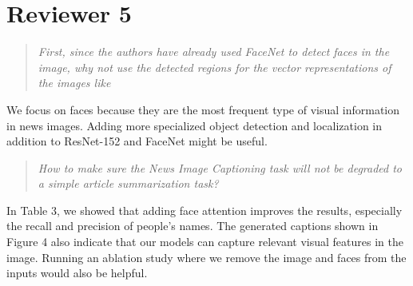 \documentclass[10pt,twocolumn,letterpaper]{article}
\begin{document}
\section{Reviewer 5}

\begin{quote}\textit{First, since the authors have already used FaceNet to
detect faces in the image, why not use the detected regions for the vector
representations of the images like~\cite{Anderson2017BottomUpAT}}
\end{quote}
We focus on faces because they are the most frequent type of visual information
in news images. Adding more specialized object detection and localization in
addition to ResNet-152 and FaceNet might be useful.

\begin{quote}\textit{How to make sure the News Image Captioning task will not
be degraded to a simple article summarization task?}
\end{quote}
In Table 3, we showed that adding face attention improves the results,
especially the recall and precision of people's names. The generated captions
shown in Figure 4 also indicate that our models can capture relevant visual
features in the image. Running an ablation study where we remove the image and
faces from the inputs would also be helpful.


{\small


}
\end{document}
